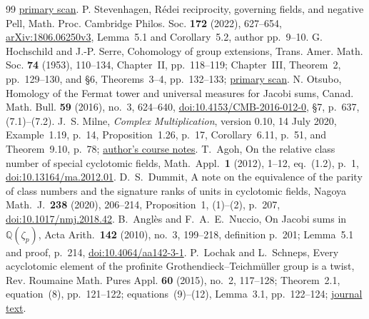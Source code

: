 \documentclass[11pt,a4paper]{article}
\theoremstyle{definition}
\theoremstyle{remark}
\begin{document}
\begin{thebibliography}{99}
\href{https://www.sas.rochester.edu/mth/sites/doug-ravenel/otherpapers/lubin-tate.pdf}{primary scan}.
 P. Stevenhagen, R\'edei reciprocity, governing fields, and negative Pell, Math. Proc. Cambridge Philos. Soc. \textbf{172} (2022), 627--654, \href{https://arxiv.org/abs/1806.06250v3}{arXiv:1806.06250v3}, Lemma~5.1 and Corollary~5.2, author pp.~9--10.
G. Hochschild and J.-P. Serre, Cohomology of group extensions,
Trans. Amer. Math. Soc. \textbf{74} (1953), 110--134,
Chapter~II, pp.~118--119; Chapter~III, Theorem~2, pp.~129--130,
and \S6, Theorems~3--4, pp.~132--133;
\href{https://www.sas.rochester.edu/mth/sites/doug-ravenel/otherpapers/hochschild-serre.pdf}{primary scan}.
 N. Otsubo, Homology of the Fermat tower and universal measures for Jacobi sums, Canad. Math. Bull. \textbf{59} (2016), no.~3, 624--640, \href{https://doi.org/10.4153/CMB-2016-012-0}{doi:10.4153/CMB-2016-012-0}, \S7, p.~637, (7.1)--(7.2).
 J.~S. Milne, \emph{Complex Multiplication},
version 0.10, 14 July 2020, Example~1.19, p.~14,
Proposition~1.26, p.~17, Corollary~6.11, p.~51, and
Theorem~9.10, p.~78;
\href{https://www.jmilne.org/math/CourseNotes/CM.pdf}{author's course notes}.
 T.~Agoh, On the relative class number of special
cyclotomic fields, Math.\ Appl.\ \textbf{1} (2012), 1--12,
eq.~(1.2), p.~1, \href{https://doi.org/10.13164/ma.2012.01}{doi:10.13164/ma.2012.01}.
 D.~S.~Dummit, A note on the equivalence of the parity
of class numbers and the signature ranks of units in cyclotomic fields,
Nagoya Math.\ J.\ \textbf{238} (2020), 206--214, Proposition~1,
(1)--(2), p.~207, \href{https://doi.org/10.1017/nmj.2018.42}{doi:10.1017/nmj.2018.42}.
 B.~Angl\`es and F.~A.~E.~Nuccio, On Jacobi sums
in \(\mathbb Q(\zeta_p)\), Acta Arith.\ \textbf{142} (2010), no.~3,
199--218, definition p.~201; Lemma~5.1 and proof, p.~214,
\href{https://doi.org/10.4064/aa142-3-1}{doi:10.4064/aa142-3-1}.
 P.~Lochak and L.~Schneps, Every acyclotomic element of the
profinite Grothendieck--Teichm\"uller group is a twist,
Rev. Roumaine Math. Pures Appl. \textbf{60} (2015), no.~2, 117--128;
Theorem~2.1, equation~(8), pp.~121--122; equations~(9)--(12),
Lemma~3.1, pp.~122--124; \href{https://imar.ro/journals/Revue_Mathematique/pdfs/2015/2/3.pdf}{journal text}.
\end{thebibliography}

\end{document}
